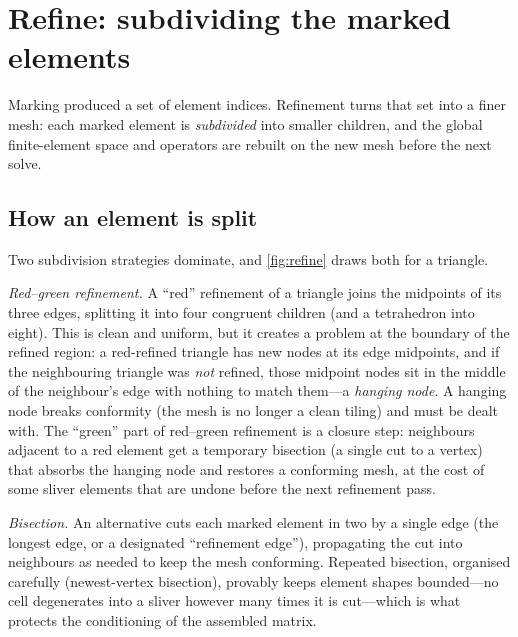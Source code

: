 \section{Refine: subdividing the marked elements}
\label{sec:refine}

Marking produced a set of element indices. Refinement turns that set into a finer
mesh: each marked element is \emph{subdivided} into smaller children, and the global
finite-element space and operators are rebuilt on the new mesh before the next solve.

\subsection{How an element is split}

Two subdivision strategies dominate, and \cref{fig:refine} draws both for a triangle.

\emph{Red--green refinement.} A ``red'' refinement of a triangle joins the midpoints
of its three edges, splitting it into four congruent children (and a tetrahedron into
eight). This is clean and uniform, but it creates a problem at the boundary of the
refined region: a red-refined triangle has new nodes at its edge midpoints, and if the
neighbouring triangle was \emph{not} refined, those midpoint nodes sit in the middle
of the neighbour's edge with nothing to match them---a \emph{hanging node}. A hanging
node breaks conformity (the mesh is no longer a clean tiling) and must be dealt with.
The ``green'' part of red--green refinement is a closure step: neighbours adjacent to a
red element get a temporary bisection (a single cut to a vertex) that absorbs the
hanging node and restores a conforming mesh, at the cost of some sliver elements that
are undone before the next refinement pass.

\emph{Bisection.} An alternative cuts each marked element in two by a single edge
(the longest edge, or a designated ``refinement edge''), propagating the cut into
neighbours as needed to keep the mesh conforming. Repeated bisection, organised
carefully (newest-vertex bisection), provably keeps element shapes bounded---no cell
degenerates into a sliver however many times it is cut---which is what protects the
conditioning of the assembled matrix.

